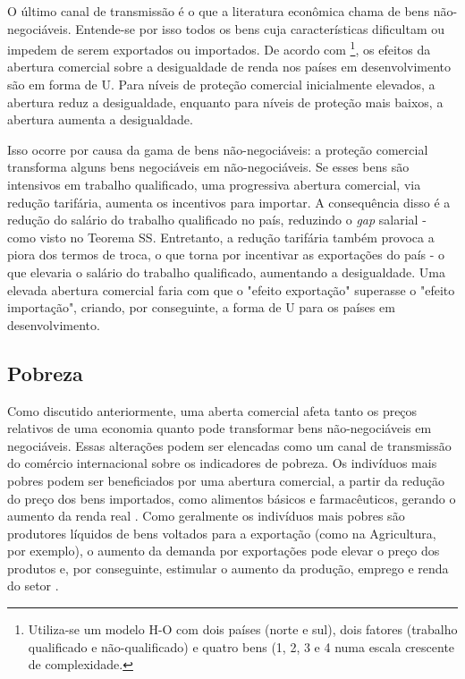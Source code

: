 O último canal de transmissão é o que a literatura econômica chama de bens não-negociáveis. Entende-se por isso todos os bens cuja características dificultam ou impedem de serem exportados ou importados. De acordo com \textcite{xu03}\footnote{Utiliza-se um modelo H-O com dois países (norte e sul), dois fatores (trabalho qualificado e não-qualificado) e quatro bens (1, 2, 3 e 4 numa escala crescente de complexidade.}, os efeitos da abertura comercial sobre a desigualdade de renda nos países em desenvolvimento são em forma de U. Para níveis de proteção comercial inicialmente elevados, a abertura reduz a desigualdade, enquanto para níveis de proteção mais baixos, a abertura aumenta a desigualdade.

Isso ocorre por causa da gama de bens não-negociáveis: a proteção comercial transforma alguns bens negociáveis em não-negociáveis. Se esses bens são intensivos em trabalho qualificado, uma progressiva abertura comercial, via redução tarifária, aumenta os incentivos para importar. A consequência disso é a redução do salário do trabalho qualificado no país, reduzindo o \textit{gap} salarial - como visto no Teorema SS. Entretanto, a redução tarifária também provoca a piora dos termos de troca, o que torna por incentivar as exportações do país - o que elevaria o salário do trabalho qualificado, aumentando a desigualdade. Uma elevada abertura comercial faria com que o "efeito exportação" superasse o "efeito importação", criando, por conseguinte, a forma de U para os países em desenvolvimento.


\subsection{Pobreza} \label{subsec:pobreza}

Como discutido anteriormente, uma aberta comercial afeta tanto os preços relativos de uma economia quanto pode transformar bens não-negociáveis em negociáveis. Essas alterações podem ser elencadas como um canal de transmissão do comércio internacional sobre os indicadores de pobreza. Os indivíduos mais pobres podem ser beneficiados por uma abertura comercial, a partir da redução do preço dos bens importados, como alimentos básicos e farmacêuticos, gerando o aumento da renda real \cite{bannisterthugge01}. Como geralmente os indivíduos mais pobres são produtores líquidos de bens voltados para a exportação (como na Agricultura, por exemplo), o aumento da demanda por exportações pode elevar o preço dos produtos e, por conseguinte, estimular o aumento da produção, emprego e renda do setor \cite{bannisterthugge01}.

